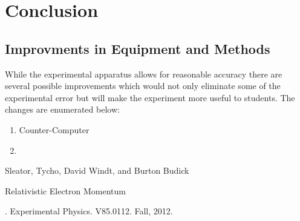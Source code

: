 \section{Conclusion}
\subsection{Improvments in Equipment and Methods}
While the experimental apparatus allows for reasonable accuracy there are several possible improvements which would not only eliminate some of the experimental error but will make the experiment more useful to students.  The changes are enumerated below:
\begin{enumerate}
\item Counter-Computer
\item 
\end{enumerate} 


\begin{thebibliography}{99}
Sleator, Tycho, David Windt, and Burton Budick \begin{em}Relativistic Electron Momentum\end{em}. Experimental Physics. V85.0112. Fall, 2012.
\end{thebibliography}

